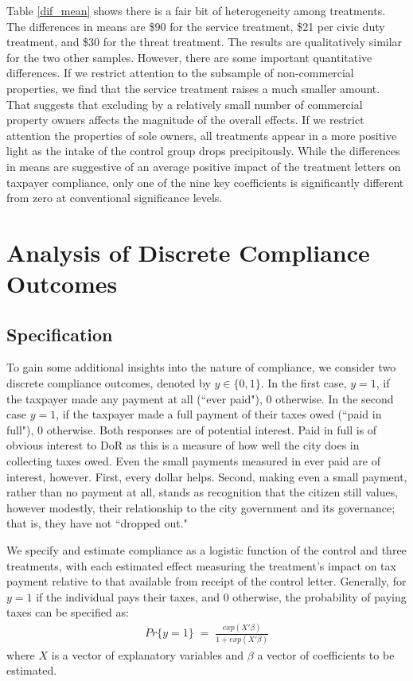 \documentclass[12pt,titlepage]{article}
\begin{document}
Table \ref{dif_mean} shows there is a fair bit of heterogeneity among treatments. The differences in means 
are \$90 for the service treatment, \$21 per civic duty treatment, and \$30 for the 
threat treatment. The results are qualitatively similar for the two other samples. However, 
there are some important quantitative differences. If we restrict attention to the subsample of
non-commercial properties, we find that the service treatment raises a
much smaller amount. That suggests that excluding by a relatively small number of 
commercial property owners affects the magnitude of the overall effects.  If we restrict
attention the properties of sole owners, all treatments appear in a
more positive light as the intake of the control group drops
precipitously. While the differences in means are suggestive of
an average positive impact of the treatment letters on taxpayer compliance, only one of the nine key coefficients is significantly different from zero 
at conventional significance levels.

\section{Analysis of Discrete Compliance Outcomes}

\subsection{Specification}

To gain some additional insights into the nature of compliance, we 
consider two discrete compliance outcomes, denoted by $y \in \{0,1\}$. 
In the first case, $y= 1$, if the taxpayer made any payment at all (``ever paid"), 0
otherwise.  In the second case  $y = 1$, if the taxpayer made a full payment of their
taxes owed (``paid in full"), 0 otherwise.  Both responses are of
potential interest.  Paid in full is of obvious interest to DoR as
this is a measure of how well the city does in collecting taxes owed.
Even the small payments measured in ever paid are of interest,
however.  First, every dollar helps.  Second, making even a small
payment, rather than no payment at all, stands as recognition that the
citizen still values, however modestly, their relationship to the city
government and its governance; that is, they have not ``dropped out."

We specify and estimate compliance
as a logistic function of the control and three treatments, with each
estimated effect measuring the treatment's impact on tax payment
relative to that available from receipt of the control letter.
Generally, for $y = 1$ if the individual pays their taxes, and 0
otherwise, the probability of paying taxes can be specified as:
\begin{eqnarray*}
Pr \{ y=1 \} \; = \; \frac{exp(X' \beta)}{1 + exp(X' \beta)}
\end{eqnarray*}
where $X$ is a vector of explanatory variables and $\beta$ a vector of
coefficients to be estimated.
\end{document}
